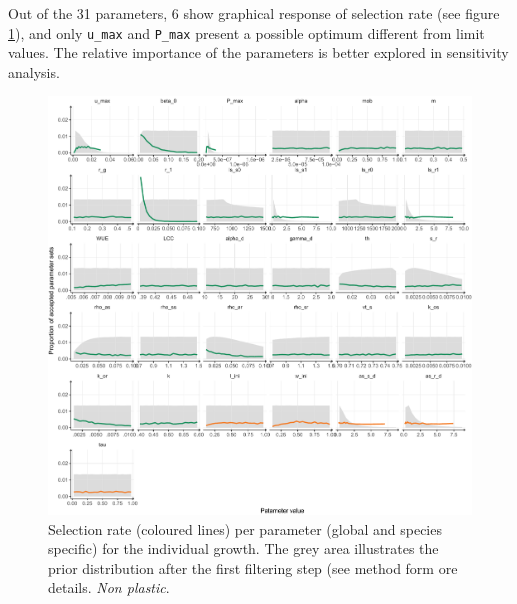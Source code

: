 Out of the 31 parameters, 6 show graphical response of selection rate (see figure \ref{fig:accept_rate}), and only  \texttt{u\_max} and \texttt{P\_max} present a possible optimum different from limit values. The relative importance of the parameters is better explored in sensitivity analysis.







\begin{figure}[p]\label{fig:accept_rate}
\includegraphics[width = \textwidth]{./2_PP/Figures/Calibration/acceptance_rate_RSRnWeight_per_par_none.pdf}
\caption[Selection rate of all parameters.]{Selection rate (coloured lines) per parameter  (\textcolor{myGreen}{global} and \textcolor{myOrange}{species specific}) for the individual growth. The grey area illustrates the prior distribution after the first filtering step (see method form ore details. \textit{Non plastic}.}
\end{figure}


